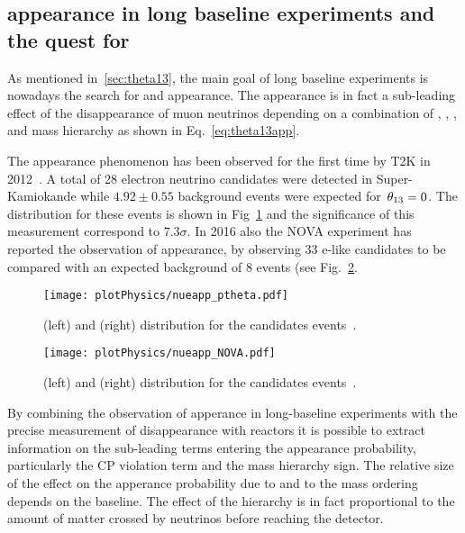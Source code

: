 \subsection{\nue appearance in long baseline experiments and the quest for \dcp}
As mentioned in~\ref{sec:theta13}, the main goal of long baseline experiments is nowadays the search for \nue and \nueb appearance. The \nue appearance is in fact a sub-leading effect of the disappearance of muon neutrinos depending on a combination of \thint, \thatm, \dcp, and mass hierarchy as shown in Eq.~\ref{eq:theta13app}.

The \nue appearance phenomenon has been observed for the first time by T2K in 2012~\cite{Abe:2013hdq}. A total of 28 electron neutrino candidates were detected in Super-Kamiokande while $4.92\pm0.55$ background events were expected for $\textrm \,\theta_{13}=0$. The \ptheta distribution for these events is shown in Fig~\ref{fig:t2kapp} and the significance of this measurement correspond to $7.3\sigma$. In 2016 also the NOVA experiment has reported the observation of \nue appearance, by observing 33 e-like candidates to be compared with an expected background of 8 events (see Fig.~\ref{fig:novaapp}.

\begin{figure} [h!]
\begin{center}
\texttt{[image: plotPhysics/nueapp\_ptheta.pdf]}
\caption{\label{fig:t2kapp} \ptheta (left) and \erec (right) distribution for the \nue candidates events~\cite{Abe:2013hdq}.}
\end{center}
\end{figure}

\begin{figure} [h!]
\begin{center}
\texttt{[image: plotPhysics/nueapp\_NOVA.pdf]}
\caption{\label{fig:novaapp} \ptheta (left) and \erec (right) distribution for the \nue candidates events~\cite{Abe:2013hdq}.}
\end{center}
\end{figure}

By combining the observation of \nue apperance in long-baseline experiments with the precise measurement of \nueb disappearance with reactors it is possible to extract information on the sub-leading terms entering the appearance probability, particularly the CP violation term \dcp and the mass hierarchy sign. 
The relative size of the effect on the apperance probability due to \dcp and to the mass ordering depends on the baseline. The effect of the hierarchy is in fact proportional to the amount of matter crossed by neutrinos before reaching the detector. 

